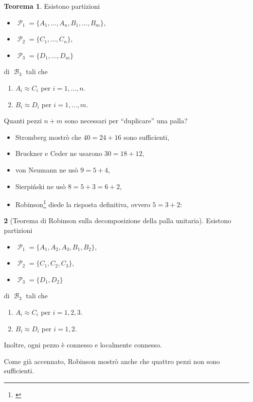 \documentclass[12pt,a4paper]{report}
\theoremstyle{definition}
\newtheorem{teo}{Teorema}[section]  %
\theoremstyle{num.custom-title}
\newtheorem{teo_custom-title}[teo]{} %
\DeclareMathOperator{\B}{\mathcal{B}}
\DeclareMathOperator{\PP}{\mathcal{P}}
\begin{document}
\begin{teo}
Esistono partizioni
\begin{itemize}
\item[] $\PP_1=\{A_1,...,A_n,B_1,...,B_m\}$,
\item[] $\PP_2=\{C_1,...,C_n\}$,
\item[] $\PP_3=\{D_1,...,D_m\}$
\end{itemize}
di $\B_3$ tali che 
\begin{enumerate}
\item $A_i \approx C_i$ per $i=1,...,n$.
\item $B_i \approx D_i$ per $i=1,...,m$.
\end{enumerate}
\end{teo}

Quanti pezzi $n+m$ sono necessari per ``duplicare'' una palla?

\begin{itemize}
\item Stromberg mostrò che $40=24+16$ sono sufficienti,
\item Bruckner e Ceder ne usarono $30=18+12$,
\item von Neumann ne usò $9=5+4$,
\item Sierpiński ne usò $8=5+3=6+2$,
\item Robinson\footnote{\cite{Rob47:Herrlich}} diede la risposta definitiva, ovvero $5=3+2$:
\end{itemize}

\begin{teo_custom-title}[Teorema di Robinson sulla decomposizione della palla unitaria]
Esistono partizioni
\begin{itemize}
\item[] $\PP_1=\{A_1,A_2,A_3,B_1,B_2\}$,
\item[] $\PP_2=\{C_1,C_2,C_3\}$,
\item[] $\PP_3=\{D_1,D_2\}$
\end{itemize}
di $\B_3$ tali che 
\begin{enumerate}
\item $A_i \approx C_i$ per $i=1,2,3$.
\item $B_i \approx D_i$ per $i=1,2$.
\end{enumerate}
Inoltre, ogni pezzo è connesso e localmente connesso.
\end{teo_custom-title}

Come già accennato, Robinson mostrò anche che quattro pezzi non sono sufficienti.\\
\end{document}
